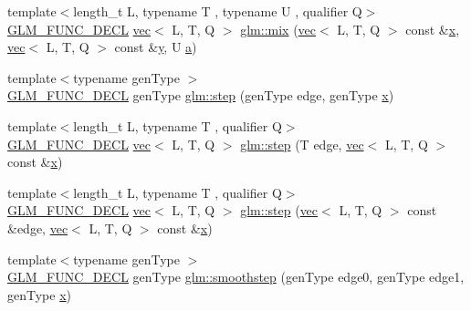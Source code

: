 \begin{DoxyCompactItemize}
{\footnotesize template$<$length\+\_\+t L, typename T , typename U , qualifier Q$>$ }\\\hyperlink{setup_8hpp_ab2d052de21a70539923e9bcbf6e83a51}{G\+L\+M\+\_\+\+F\+U\+N\+C\+\_\+\+D\+E\+CL} \hyperlink{structglm_1_1vec}{vec}$<$ L, T, Q $>$ \hyperlink{group__core__func__common_gac18f8fdaae00f0a27a4d01d3aa507aad}{glm\+::mix} (\hyperlink{structglm_1_1vec}{vec}$<$ L, T, Q $>$ const \&\hyperlink{_s_d_l__opengl_8h_ad0e63d0edcdbd3d79554076bf309fd47}{x}, \hyperlink{structglm_1_1vec}{vec}$<$ L, T, Q $>$ const \&\hyperlink{_s_d_l__opengl_8h_a1675d9d7bb68e1657ff028643b4037e3}{y}, U \hyperlink{_s_d_l__opengl__glext_8h_a3309789fc188587d666cda5ece79cf82}{a})
\item 
{\footnotesize template$<$typename gen\+Type $>$ }\\\hyperlink{setup_8hpp_ab2d052de21a70539923e9bcbf6e83a51}{G\+L\+M\+\_\+\+F\+U\+N\+C\+\_\+\+D\+E\+CL} gen\+Type \hyperlink{group__core__func__common_ga015a1261ff23e12650211aa872863cce}{glm\+::step} (gen\+Type edge, gen\+Type \hyperlink{_s_d_l__opengl_8h_ad0e63d0edcdbd3d79554076bf309fd47}{x})
\item 
{\footnotesize template$<$length\+\_\+t L, typename T , qualifier Q$>$ }\\\hyperlink{setup_8hpp_ab2d052de21a70539923e9bcbf6e83a51}{G\+L\+M\+\_\+\+F\+U\+N\+C\+\_\+\+D\+E\+CL} \hyperlink{structglm_1_1vec}{vec}$<$ L, T, Q $>$ \hyperlink{group__core__func__common_ga8f9a911a48ef244b51654eaefc81c551}{glm\+::step} (T edge, \hyperlink{structglm_1_1vec}{vec}$<$ L, T, Q $>$ const \&\hyperlink{_s_d_l__opengl_8h_ad0e63d0edcdbd3d79554076bf309fd47}{x})
\item 
{\footnotesize template$<$length\+\_\+t L, typename T , qualifier Q$>$ }\\\hyperlink{setup_8hpp_ab2d052de21a70539923e9bcbf6e83a51}{G\+L\+M\+\_\+\+F\+U\+N\+C\+\_\+\+D\+E\+CL} \hyperlink{structglm_1_1vec}{vec}$<$ L, T, Q $>$ \hyperlink{group__core__func__common_gaf4a5fc81619c7d3e8b22f53d4a098c7f}{glm\+::step} (\hyperlink{structglm_1_1vec}{vec}$<$ L, T, Q $>$ const \&edge, \hyperlink{structglm_1_1vec}{vec}$<$ L, T, Q $>$ const \&\hyperlink{_s_d_l__opengl_8h_ad0e63d0edcdbd3d79554076bf309fd47}{x})
\item 
{\footnotesize template$<$typename gen\+Type $>$ }\\\hyperlink{setup_8hpp_ab2d052de21a70539923e9bcbf6e83a51}{G\+L\+M\+\_\+\+F\+U\+N\+C\+\_\+\+D\+E\+CL} gen\+Type \hyperlink{group__core__func__common_ga562edf7eca082cc5b7a0aaf180436daf}{glm\+::smoothstep} (gen\+Type edge0, gen\+Type edge1, gen\+Type \hyperlink{_s_d_l__opengl_8h_ad0e63d0edcdbd3d79554076bf309fd47}{x})

\end{DoxyCompactItemize}
